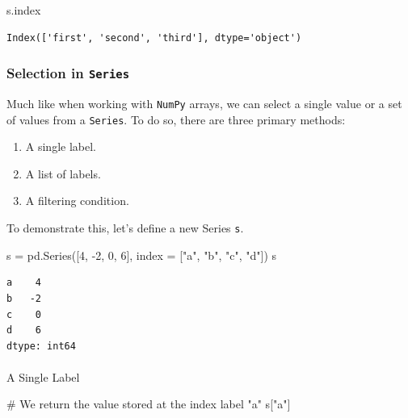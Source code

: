 \documentclass[
  letterpaper,
  DIV=11,
  numbers=noendperiod]{scrreprt}
\makeatletter
\let\oldparagraph\paragraph
\renewcommand{\paragraph}{
    \@ifstar
      \xxxParagraphStar
      \xxxParagraphNoStar
  }
\newcommand{\xxxParagraphStar}[1]{\oldparagraph*{#1}\mbox{}}
\newcommand{\xxxParagraphNoStar}[1]{\oldparagraph{#1}\mbox{}}
\newenvironment{Shaded}{\begin{snugshade}}{\end{snugshade}}
\newcommand{\CommentTok}[1]{\textcolor[rgb]{0.37,0.37,0.37}{#1}}
\newcommand{\DecValTok}[1]{\textcolor[rgb]{0.68,0.00,0.00}{#1}}
\newcommand{\NormalTok}[1]{\textcolor[rgb]{0.00,0.23,0.31}{#1}}
\newcommand{\OperatorTok}[1]{\textcolor[rgb]{0.37,0.37,0.37}{#1}}
\newcommand{\StringTok}[1]{\textcolor[rgb]{0.13,0.47,0.30}{#1}}
\providecommand{\tightlist}{%
  \setlength{\itemsep}{0pt}\setlength{\parskip}{0pt}}\usepackage{longtable,booktabs,array}
\makeatother
\begin{document}
\begin{Shaded}
\begin{Highlighting}[]
\NormalTok{s.index}
\end{Highlighting}
\end{Shaded}

\begin{verbatim}
Index(['first', 'second', 'third'], dtype='object')
\end{verbatim}

\subsubsection{\texorpdfstring{Selection in
\texttt{Series}}{Selection in Series}}\label{selection-in-series}

Much like when working with \texttt{NumPy} arrays, we can select a
single value or a set of values from a \texttt{Series}. To do so, there
are three primary methods:

\begin{enumerate}
\def\labelenumi{\arabic{enumi}.}
\tightlist
\item
  A single label.
\item
  A list of labels.
\item
  A filtering condition.
\end{enumerate}

To demonstrate this, let's define a new Series \texttt{s}.

\begin{Shaded}
\begin{Highlighting}[]
\NormalTok{s }\OperatorTok{=}\NormalTok{ pd.Series([}\DecValTok{4}\NormalTok{, }\OperatorTok{{-}}\DecValTok{2}\NormalTok{, }\DecValTok{0}\NormalTok{, }\DecValTok{6}\NormalTok{], index }\OperatorTok{=}\NormalTok{ [}\StringTok{"a"}\NormalTok{, }\StringTok{"b"}\NormalTok{, }\StringTok{"c"}\NormalTok{, }\StringTok{"d"}\NormalTok{])}
\NormalTok{s}
\end{Highlighting}
\end{Shaded}

\begin{verbatim}
a    4
b   -2
c    0
d    6
dtype: int64
\end{verbatim}

\paragraph{A Single Label}\label{a-single-label}

\begin{Shaded}
\begin{Highlighting}[]
\CommentTok{\# We return the value stored at the index label "a"}
\NormalTok{s[}\StringTok{"a"}\NormalTok{] }
\end{Highlighting}
\end{Shaded}
\end{document}

